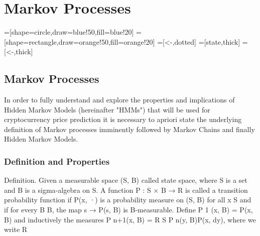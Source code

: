 

\chapter{Markov Processes}  %

\ifpdf
    \graphicspath{{Chapter1/Figs/Raster/}{Chapter1/Figs/PDF/}{Chapter1/Figs/}}
\else
    \graphicspath{{Chapter1/Figs/Vector/}{Chapter1/Figs/}}
\fi

=[shape=circle,draw=blue!50,fill=blue!20]
=[shape=rectangle,draw=orange!50,fill=orange!20]
=[<-,dotted]
=[state,thick]
=[<-,thick]


\section{Markov Processes} %

In order to fully understand and explore the properties and implications of Hidden Markov Models (hereinafter "HMMs") that will be used for cryptocurrency price prediction it is necessary to apriori state the underlying definition of Markov processes imminently followed by Markov Chains and finally Hidden Markov Models. 

\subsection{Definition and Properties}

Definition. Given a measurable space (S, B) called state space, where S is
a set and B is a {sigma}-algebra on S. A function P : S × B → R is called a
transition probability function if P(x, ·) is a probability measure on (S, B)
for all x  S and if for every B  B, the map s → P(s, B) is B-measurable.
Define P
1
(x, B) = P(x, B) and inductively the measures P
n+1(x, B) =
R
S
P
n(y, B)P(x, dy), where we write R








